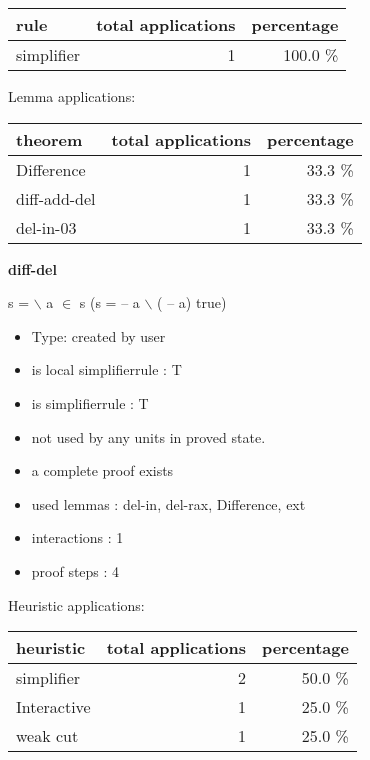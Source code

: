 \documentclass[a4paper]{article}
\begin{document}
\begin{supertabular}{l|r|r}
rule	        & total applications & percentage \\ \hline
simplifier & 1 & 100.0 \% \\

\end{supertabular}

Lemma applications:

\begin{supertabular}{l|r|r}
theorem	        & total applications & percentage \\ \hline
Difference & 1 & 33.3 \% \\
diff-add-del & 1 & 33.3 \% \\
del-in-03 & 1 & 33.3 \% \\

\end{supertabular}
\pagebreak

{\LARGE\bf diff-del}\label{lemma-diff-del}

\medskip

 \Fol s =  $\backslash$  \And \Not a $\in$ s \Imp (s =  -- a $\backslash$ ( -- a) \Equiv true)

\begin{itemize}

\item Type: created by user

\item is local simplifierrule : T
\item is simplifierrule : T
\item not used by any units in proved state.
\item       a complete proof exists
\item       used lemmas  : del-in, del-rax, Difference, ext
\item       interactions : 1
\item       proof steps  : 4
\end{itemize}

\medskip


Heuristic applications:

\begin{supertabular}{l|r|r}
heuristic	& total applications & percentage \\ \hline
simplifier & 2 & 50.0 \% \\
Interactive & 1 & 25.0 \% \\
weak cut & 1 & 25.0 \% \\

\end{supertabular}
\end{document}
